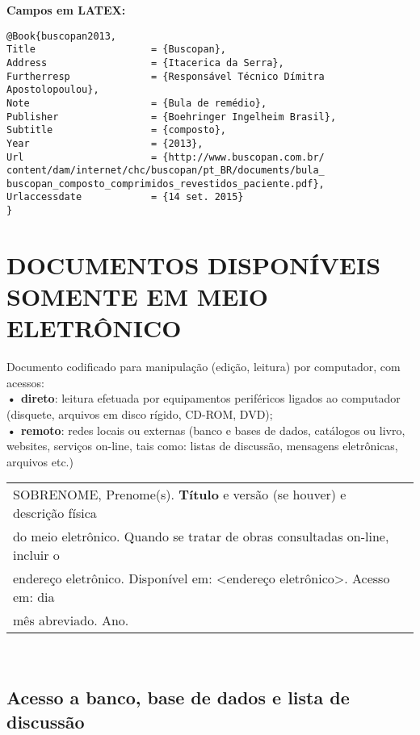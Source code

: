\textbf{Campos em LATEX:} 
	
\begingroup
\fontsize{10pt}{12pt}\selectfont
\begin{verbatim}
@Book{buscopan2013,
Title                    = {Buscopan},
Address                  = {Itacerica da Serra},
Furtherresp              = {Responsável Técnico Dímitra 
Apostolopoulou},
Note                     = {Bula de remédio},
Publisher                = {Boehringer Ingelheim Brasil},
Subtitle                 = {composto},
Year                     = {2013},
Url                      = {http://www.buscopan.com.br/
content/dam/internet/chc/buscopan/pt_BR/documents/bula_
buscopan_composto_comprimidos_revestidos_paciente.pdf},
Urlaccessdate            = {14 set. 2015}
}

\end{verbatim}
\endgroup
	
\section{DOCUMENTOS DISPONÍVEIS SOMENTE EM MEIO ELETRÔNICO}
	
Documento codificado para manipulação (edição, leitura) por computador, com acessos:\\
\textbf{• direto}: leitura efetuada por equipamentos periféricos ligados ao
computador (disquete, arquivos em disco rígido, CD-ROM, DVD);\\
\textbf{• remoto}: redes locais ou externas (banco e bases de dados,
catálogos ou livro, websites, serviços on-line, tais como: listas de
discussão, mensagens eletrônicas, arquivos etc.) \cite{Weitzc2016} \\
	
\begin{tabular}{|l|c|} \hline
	SOBRENOME, Prenome(s). \textbf{Título} e versão (se houver) e descrição física \\do meio eletrônico. Quando se tratar de obras consultadas on-line, incluir o \\ endereço eletrônico. Disponível em: <endereço eletrônico>. Acesso em: dia \\mês abreviado. Ano. 
	                                                                                    \\\hline
\end{tabular} \\
	
\subsection{Acesso a banco, base de dados e lista de discussão}
	
